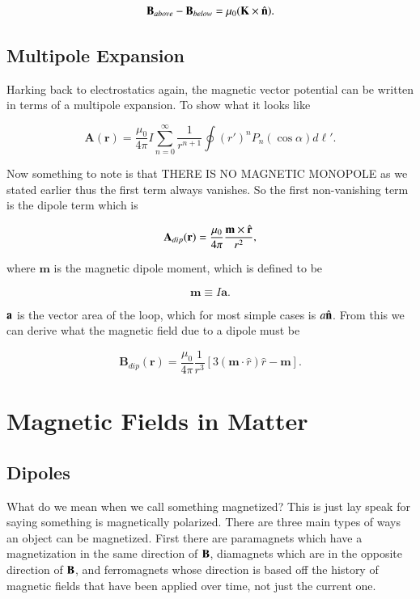 \documentclass[preprint, review,12pt]{elsarticle}
\def\m{\frac{\mu_0}{4\pi}}
\def\x{\times}
\def\.{\cdot}
\def\b{\textbf}
\def\bell{\bm{\ell}}
\def\={\equiv}
\newcommand{\hb}[1]{\hat{\b #1}}
\begin{document}
\begin{equation}
    \b{B}_{above} - \b{B}_{below}= \mu_0 (\b{K} \x \hb{n}).
\end{equation}

\subsection{Multipole Expansion}

Harking back to electrostatics again, the magnetic vector potential can be written in terms of a multipole expansion. To show what it looks like

\begin{equation}
    \b{A}(\b{r}) = \m I \sum_{n=0}^\infty \frac{1}{r^{n+1}}\oint (r')^n  P_n(\cos\alpha) d\bell '.
\end{equation}

Now something to note is that THERE IS NO MAGNETIC MONOPOLE as we stated earlier thus the first term always vanishes. So the first non-vanishing term is the dipole term which is

\begin{equation}
    \b{A}_{dip}(\b{r}) = \m \frac{\b{m} \x \hb{r}}{r^2},
\end{equation}

where $\b{m}$ is the magnetic dipole moment, which is defined to be

\begin{equation}
    \b{m} \= I\b{a}.
\end{equation}

$\b a$ is the vector area of the loop, which for most simple cases is $a\hb{n}$. From this we can derive what the magnetic field due to a dipole must be

\begin{equation}
    \b{B}_{dip}(\b{r}) = \m \frac{1}{r^3}[3(\b{m} \. \hat{r})\hat{r} - \b{m}].
\end{equation}

\section{Magnetic Fields in Matter}

\subsection{Dipoles}

What do we mean when we call something magnetized? This is just lay speak for saying something is magnetically polarized. There are three main types of ways an object can be magnetized. First there are paramagnets which have a magnetization in the same direction of $\b B$, diamagnets which are in the opposite direction of $\b B$, and ferromagnets whose direction is based off the history of magnetic fields that have been applied over time, not just the current one.
\end{document}
